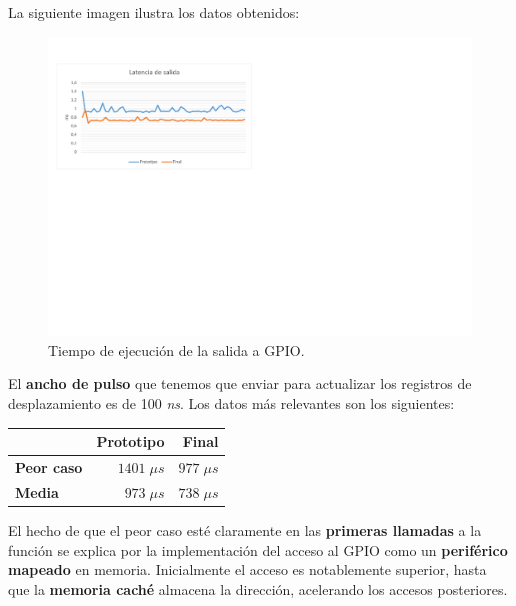 La siguiente imagen ilustra los datos obtenidos:

\smallskip

\begin{figure}[H]
	\noindent \begin{centering}
		\includegraphics[width=\linewidth*3/4]{capitulo6/lat_gpio}
		\par\end{centering}
	\smallskip
	\caption{\label{fig:lat_gpio} Tiempo de ejecución de la salida a GPIO.}
\end{figure}

\smallskip

El \textbf{ancho de pulso} que tenemos que enviar para actualizar los registros de desplazamiento es de 100 \textit{ns}. Los datos más relevantes son los siguientes:

\smallskip

\begin{center}
	\begin{tabular}{|l|r|r|}
		\hline & \textbf{Prototipo} & \textbf{Final} \\ 
		\hline \textbf{Peor caso} & $1401 \; \mu s$ & $977 \; \mu s$ \\
		\hline \textbf{Media} & $973 \; \mu s$ & $738 \; \mu s$ \\
		\hline
	\end{tabular}
	\smallskip
\end{center}

\smallskip

El hecho de que el peor caso esté claramente en las \textbf{primeras llamadas} a la función se explica por la implementación del acceso al \acrshort{GPIO} como un \textbf{periférico mapeado} en memoria. Inicialmente el acceso es notablemente superior, hasta que la \textbf{memoria caché} almacena la dirección, acelerando los accesos posteriores.

